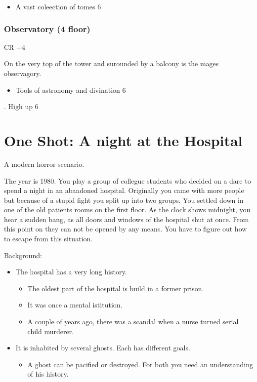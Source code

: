\documentclass[11pt]{article}
\begin{document}
{\begin{itemize}
\item A vast coleection of tomes 6
\end{itemize}
\subsubsection{Observatory (4 floor)}
\label{sec:org09c9811}
CR +4

On the very top of the tower and surounded by a balcony is the mages observagory.

\begin{itemize}
\item Tools of astronomy and divination 6
\end{itemize}
. High up 6
\section{One Shot: A night at the Hospital}
\label{sec:org69c0400}

A modern horror scenario.

The year is 1980. You play a group of collegue students who decided on a dare to spend a night in an abandoned hospital. Originally you came with more people but because of a stupid fight you split up into two groups. You settled down in one of the old patients rooms on the first floor. As the clock shows midnight, you hear a sudden bang, as all doors and windows of the hospital shut at once. From this point on they can not be opened by any means. You have to figure out how to escape from this situation. 

Background:
\begin{itemize}
\item The hospital has a very long history.
\begin{itemize}
\item The oldest part of the hospital is build in a former prison.
\item It was once a mental istitution.
\item A couple of years ago, there was a scandal when a nurse turned serial child murderer.
\end{itemize}
\item It is inhabited by several ghosts. Each has different goals.
\begin{itemize}
\item A ghost can be pacified or destroyed. For both you need an understanding of his history.
\end{itemize}
\end{itemize}
}
\end{document}
